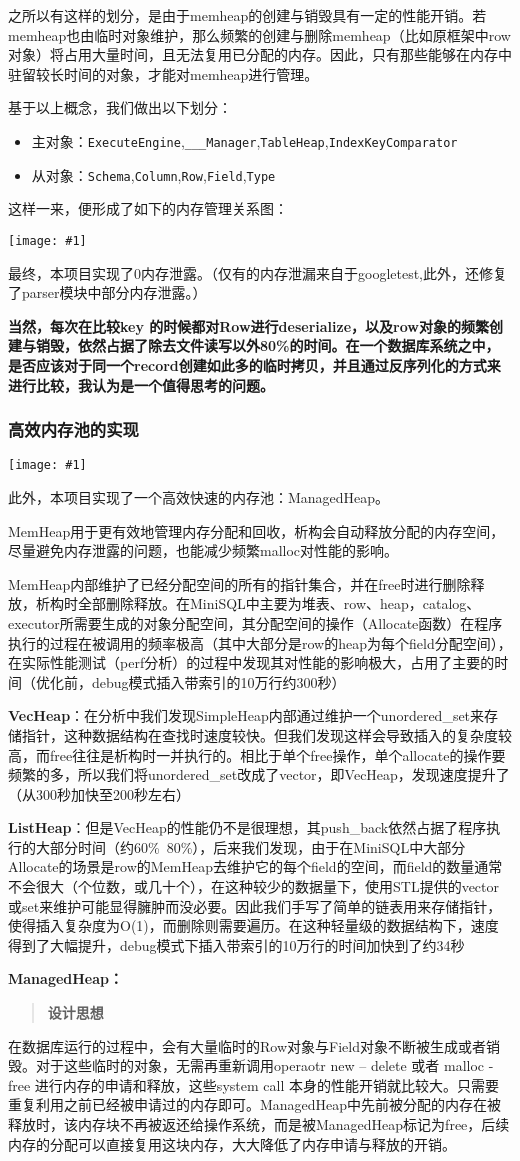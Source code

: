 \documentclass[12pt, a4paper]{article}
\def\c#1{\texttt{#1}}
\def\b#1{\textbf{#1}}
\def\sss#1{\subsubsection{#1}}
\def\p{\par}
\def\g#1{\begin{center}\texttt{[image: \#1]}\end{center}}
\def\q#1{\begin{quote}\b{#1}\end{quote}}
\begin{document}
\p 之所以有这样的划分，是由于memheap的创建与销毁具有一定的性能开销。若memheap也由临时对象维护，那么频繁的创建与删除memheap（比如原框架中row对象）将占用大量时间，且无法复用已分配的内存。因此，只有那些能够在内存中驻留较长时间的对象，才能对memheap进行管理。
\p 基于以上概念，我们做出以下划分：
\begin{itemize}
  \item 主对象：\c{ExecuteEngine},\c{\_\_\_Manager},\c{TableHeap},\c{IndexKeyComparator}
  \item 从对象：\c{Schema},\c{Column},\c{Row},\c{Field},\c{Type}
\end{itemize}
\p 这样一来，便形成了如下的内存管理关系图：
\g{mem_relation.pdf}
\p 最终，本项目实现了0内存泄露。（仅有的内存泄漏来自于googletest,此外，还修复了parser模块中部分内存泄露。）
\p \b{当然，每次在比较key 的时候都对Row进行deserialize，以及row对象的频繁创建与销毁，依然占据了除去文件读写以外80\%的时间。在一个数据库系统之中，是否应该对于同一个record创建如此多的临时拷贝，并且通过反序列化的方式来进行比较，我认为是一个值得思考的问题。}
\sss{高效内存池的实现}
\g{imgs/mem_heap.png}
\p 此外，本项目实现了一个高效快速的内存池：ManagedHeap。
\p MemHeap用于更有效地管理内存分配和回收，析构会自动释放分配的内存空间，尽量避免内存泄露的问题，也能减少频繁malloc对性能的影响。
\p MemHeap内部维护了已经分配空间的所有的指针集合，并在free时进行删除释放，析构时全部删除释放。在MiniSQL中主要为堆表、row、heap，catalog、 executor所需要生成的对象分配空间，其分配空间的操作（Allocate函数）在程序执行的过程在被调用的频率极高（其中大部分是row的heap为每个field分配空间），在实际性能测试（perf分析）的过程中发现其对性能的影响极大，占用了主要的时间（优化前，debug模式插入带索引的10万行约300秒）
\p \b{VecHeap}：在分析中我们发现SimpleHeap内部通过维护一个unordered\_set来存储指针，这种数据结构在查找时速度较快。但我们发现这样会导致插入的复杂度较高，而free往往是析构时一并执行的。相比于单个free操作，单个allocate的操作要频繁的多，所以我们将unordered\_set改成了vector，即VecHeap，发现速度提升了（从300秒加快至200秒左右）
\p \b{ListHeap}：但是VecHeap的性能仍不是很理想，其push\_back依然占据了程序执行的大部分时间（约60\%~80\%），后来我们发现，由于在MiniSQL中大部分Allocate的场景是row的MemHeap去维护它的每个field的空间，而field的数量通常不会很大（个位数，或几十个），在这种较少的数据量下，使用STL提供的vector或set来维护可能显得臃肿而没必要。因此我们手写了简单的链表用来存储指针，使得插入复杂度为O(1)，而删除则需要遍历。在这种轻量级的数据结构下，速度得到了大幅提升，debug模式下插入带索引的10万行的时间加快到了约34秒
\p \b{ManagedHeap：}
\q{设计思想}
\p 在数据库运行的过程中，会有大量临时的Row对象与Field对象不断被生成或者销毁。对于这些临时的对象，无需再重新调用operaotr new – delete 或者 malloc - free 进行内存的申请和释放，这些system call 本身的性能开销就比较大。只需要重复利用之前已经被申请过的内存即可。ManagedHeap中先前被分配的内存在被释放时，该内存块不再被返还给操作系统，而是被ManagedHeap标记为free，后续内存的分配可以直接复用这块内存，大大降低了内存申请与释放的开销。
\end{document}
